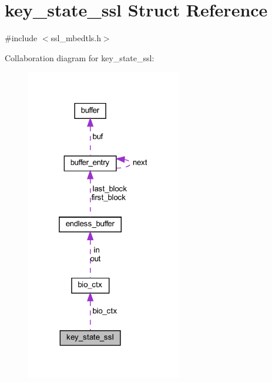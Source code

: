 \hypertarget{structkey__state__ssl}{}\section{key\+\_\+state\+\_\+ssl Struct Reference}
\label{structkey__state__ssl}


{\ttfamily \#include $<$ssl\+\_\+mbedtls.\+h$>$}



Collaboration diagram for key\+\_\+state\+\_\+ssl\+:
\nopagebreak
\begin{figure}[H]
\begin{center}
\leavevmode
\includegraphics[width=193pt]{structkey__state__ssl__coll__graph}
\end{center}
\end{figure}
